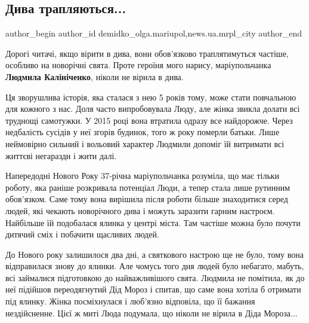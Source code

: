  
 
 
 
 
 
\subsection{Дива трапляються...}
\label{sec:09_01_2020.stz.news.ua.mrpl_city.1.dyva_trapljajutsja}
 
\ifcmt
 author_begin
   author_id demidko_olga.mariupol,news.ua.mrpl_city
 author_end
\fi

Дорогі читачі, якщо вірити в дива, вони обов'язково траплятимуться частіше,
особливо на новорічні свята. Проте героїня мого нарису, маріупольчанка \textbf{Людмила
Калініченко}, ніколи не вірила в дива.

Ця зворушлива історія, яка сталася з нею 5 років тому, може стати повчальною
для кожного з нас. Доля часто випробовувала Люду, але жінка звикла долати всі
труднощі самотужки. У 2015 році вона втратила одразу все найдорожче. Через
недбалість сусідів у неї згорів будинок, того ж року померли батьки. Лише
неймовірно сильний і вольовий характер Людмили допоміг їй витримати всі життєві
негаразди і жити далі.

Напередодні Нового Року 37-річна маріупольчанка розуміла, що має тільки роботу,
яка раніше розкривала потенціал Люди, а тепер стала лише рутинним обов'язком.
Саме тому вона вирішила після роботи більше знаходитися серед людей, які
чекають новорічного дива і можуть заразити гарним настроєм. Найбільше їй
подобалася ялинка у центрі міста. Там частіше можна було почути дитячий сміх і
побачити щасливих людей.

До Нового року залишилося два дні, а святкового настрою ще не було, тому вона
відправилася знову до ялинки. Але чомусь того дня людей було небагато, мабуть,
всі займалися підготовкою до найважливішого свята. Людмила не помітила, як до
неї підійшов переодягнутий Дід Мороз і спитав, що саме вона хотіла б отримати
під ялинку. Жінка посміхнулася і люб'язно відповіла, що її бажання
нездійсненне. Цієї ж миті Люда подумала, що ніколи не вірила в Діда Мороза... 

